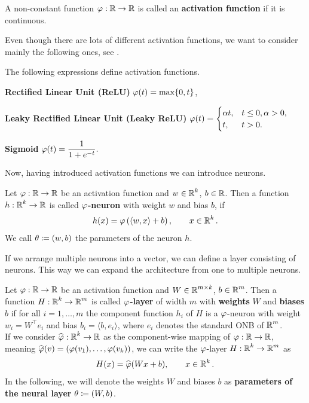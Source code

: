 \begin{definition}
A non-constant function $\operatorname{\varphi}: \operatorname{\mathbb{R}} \to \operatorname{\mathbb{R}}$ is called an \textbf{activation function} if it is continuous.
\end{definition}


Even though there are lots of different activation functions, we want to consider mainly the following ones, see \cite[Chapter~6]{goodfellow2016deep}.


\begin{example}
The following expressions define activation functions.
\begin{mydescription}{}
\item[\textbf{Rectified Linear Unit (ReLU)}] $\operatorname{\varphi}(t) = \max\{0, t\}$,
\item[\textbf{Leaky Rectified Linear Unit (Leaky ReLU)}] $\displaystyle \operatorname{\varphi}(t) = \begin{cases}
\alpha t, 	& t \leq 0, \alpha>0,\\
t,		& t > 0.
\end{cases}$
\item[\textbf{Sigmoid}] $\displaystyle \operatorname{\varphi}(t) = \frac{1}{1 + e^{-t}}.$
\end{mydescription}
\end{example}


Now, having introduced activation functions we can introduce neurons.


\begin{definition}
Let $\operatorname{\varphi}: \operatorname{\mathbb{R}} \to \operatorname{\mathbb{R}}$ be an activation function and $w\in \operatorname{\mathbb{R}}^k$, $b \in \operatorname{\mathbb{R}}$. Then a function $h: \operatorname{\mathbb{R}}^k \to \operatorname{\mathbb{R}}$ is called \textbf{$\operatorname{\varphi}$-neuron} with weight $w$ and bias $b$, if
\begin{align}\label{def_neuron}
h(x) = \operatorname{\varphi} \left(\langle w, x \rangle + b \right), \qquad x \in \operatorname{\mathbb{R}}^k.
\end{align}
We call $\theta \coloneqq (w, b)$ the parameters of the neuron $h$.
\end{definition}


If we arrange multiple neurons into a vector, we can define a layer consisting of neurons. This way we can expand the architecture from one to multiple neurons.


\begin{definition}\label{def_layer}
Let $\operatorname{\varphi}: \operatorname{\mathbb{R}} \to \operatorname{\mathbb{R}}$ be an activation function and $W \in \operatorname{\mathbb{R}}^{m\times k}$, $b\in \operatorname{\mathbb{R}}^m$. Then a function $H:\operatorname{\mathbb{R}}^k \to \operatorname{\mathbb{R}}^m$ is called \textbf{$\operatorname{\varphi}$-layer} of width $m$ with \textbf{weights} $W$ and \textbf{biases} $b$ if for all $i=1,\ldots,m$ the component function $h_i$ of $H$ is a $\operatorname{\varphi}$-neuron with weight $w_i = W^\top e_i$ and bias $b_i = \langle b, e_i \rangle$, where $e_i$ denotes the standard ONB of $\operatorname{\mathbb{R}}^m$.\\
If we consider $\widehat{\operatorname{\varphi}}: \operatorname{\mathbb{R}}^k \to \operatorname{\mathbb{R}}$ as the component-wise mapping of $\operatorname{\varphi}:\operatorname{\mathbb{R}}\to \operatorname{\mathbb{R}}$, meaning $\widehat{\operatorname{\varphi}}(v) = (\operatorname{\varphi}(v_1), \ldots, \operatorname{\varphi}(v_k))$, we can write the $\operatorname{\varphi}$-layer $H:\operatorname{\mathbb{R}}^k \to \operatorname{\mathbb{R}}^m$ as
\begin{align}\label{eq_linear_layer}
H(x) = \widehat{\operatorname{\varphi}}(Wx + b), \qquad x \in \operatorname{\mathbb{R}}^k.
\end{align}
In the following, we will denote the weights $W$ and biases $b$ as \textbf{parameters of the neural layer} $\theta \coloneqq (W, b)$.
\end{definition}


